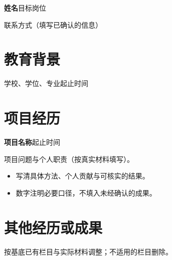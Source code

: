 \documentclass[UTF8,a4paper,10pt,fontset=fandol]{ctexart}
\begin{document}
{\LARGE\bfseries 姓名}\hfill 目标岗位

联系方式（填写已确认的信息）

\section*{教育背景}
学校、学位、专业\hfill 起止时间

\section*{项目经历}
\textbf{项目名称}\hfill 起止时间

项目问题与个人职责（按真实材料填写）。
\begin{itemize}
  \item 写清具体方法、个人贡献与可核实的结果。
  \item 数字注明必要口径，不填入未经确认的成果。
\end{itemize}

\section*{其他经历或成果}
按基底已有栏目与实际材料调整；不适用的栏目删除。
\end{document}
